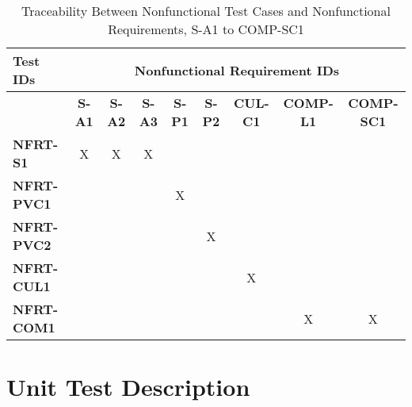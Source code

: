 \documentclass[12pt, titlepage]{article}
\begin{document}
\begin{landscape}
	\newpage
	
			\begin{longtable}{|l|cccccccc|}
	\caption{Traceability Between Nonfunctional Test Cases and Nonfunctional Requirements, S-A1 to COMP-SC1}                                                                                                                                                                                                                           \\
		\hline
		\textbf{Test IDs}   & \multicolumn{8}{c|}{\textbf{Nonfunctional Requirement IDs}}                                                                                                                                                                                                                 \\
		\hline
		~                   & \textbf{S-A1} & \textbf{S-A2} & \textbf{S-A3} & \textbf{S-P1} & \textbf{S-P2} & \textbf{CUL-C1} & \textbf{COMP-L1} & \textbf{COMP-SC1}\\
		\hline
		\textbf{NFRT-S1} & X                                                         & X             & X             & ~             & ~             & ~             & ~             & ~\\
		\textbf{NFRT-PVC1} & ~                                                         & ~             & ~             & X             & ~             & ~             & ~             & ~\\
		\textbf{NFRT-PVC2} & ~                                                         & ~             & ~             & ~             & X             & ~             & ~             & ~\\
		\textbf{NFRT-CUL1} & ~                                                         & ~             & ~             & ~             & ~             & X             & ~             & ~\\
		\textbf{NFRT-COM1} & ~                                                         & ~             & ~             & ~             & ~             & ~             & X             & X\\
		\hline
	\end{longtable}

	\newpage
\end{landscape}

\section{Unit Test Description}
\label{sec:unit}
\end{document}
